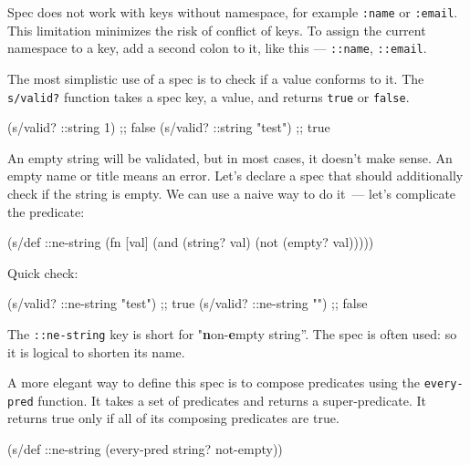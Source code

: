 
Spec does not work with keys without namespace, for example \verb|:name| or \verb|:email|. This limitation minimizes the risk of conflict of keys. To assign the current namespace to a key, add a second colon to it, like this — \verb|::name|, \verb|::email|.


The most simplistic use of a spec is to check if a value conforms to it. The \verb|s/valid?| function takes a spec key, a value, and returns \verb|true| or \verb|false|.

\begin{english}
  \begin{clojure}
(s/valid? ::string 1)      ;; false
(s/valid? ::string "test") ;; true
  \end{clojure}
\end{english}

An empty string will be validated, but in most cases, it doesn't make sense. An empty name or title means an error. Let's declare a spec that should additionally check if the string is empty. We can use a naive way to do it~--- let's complicate the predicate:


\begin{english}
  \begin{clojure}
(s/def ::ne-string
  (fn [val]
    (and (string? val)
         (not (empty? val)))))
  \end{clojure}
\end{english}

\noindent
Quick check:

\begin{english}
  \begin{clojure}
(s/valid? ::ne-string "test") ;; true
(s/valid? ::ne-string "")     ;; false
  \end{clojure}
\end{english}

The \verb|::ne-string| key is short for "\textbf{n}on-\textbf{e}mpty
string”. The spec is often used: so it is logical to shorten its name.

A more elegant way to define this spec is to compose predicates using the \verb|every-pred| function. It takes a set of predicates and returns a super-predicate. It returns true only if all of its composing predicates are true.

\begin{english}
  \begin{clojure}
(s/def ::ne-string
  (every-pred string? not-empty))
  \end{clojure}
\end{english}

